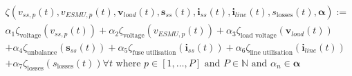 
\begin{multline}
	\zeta(v_{ss,p}(t), v_{ESMU,p}(t), \textbf{v}_{load}(t), \textbf{s}_{ss}(t), \textbf{i}_{ss}(t), \textbf{i}_{line}(t), s_\text{losses}(t), \boldsymbol{\alpha}) :=\\
	\alpha_1 \zeta_\text{voltage}(v_{ss,p}(t))%
	+ \alpha_2 \zeta_\text{voltage}(v_{ESMU,p}(t))%
	+ \alpha_3 \zeta_\text{load voltage}(\textbf{v}_{load}(t))\\
	+ \alpha_4 \zeta_\text{unbalance}(\textbf{s}_{ss}(t))%
	+ \alpha_5 \zeta_\text{fuse utilisation}(\textbf{i}_{ss}(t))%
	+ \alpha_6 \zeta_\text{line utilisation}(\textbf{i}_{line}(t))\\
	+ \alpha_7 \zeta_\text{losses}(s_\text{losses}(t))%
	 \forall t \text{ where } p \in [1, \dots, P] \text{ and } P \in \mathbb{N} \text{ and } \alpha_n \in \boldsymbol{\alpha}
\label{ch1:equ:weighted-sum-cost-function}
\end{multline}